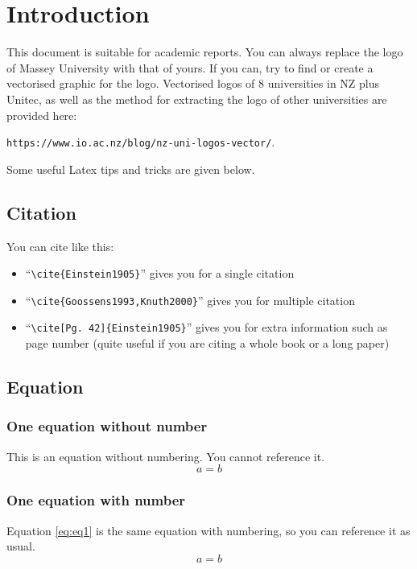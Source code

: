 
\chapter{Introduction}
\label{cp:introduction}


This document is suitable for academic reports. You can always replace the logo of Massey University with that of yours. If you can, try to find or create a vectorised graphic for the logo. Vectorised logos of 8 universities in NZ plus Unitec, as well as the method for extracting the logo of other universities are provided here:

\verb|https://www.io.ac.nz/blog/nz-uni-logos-vector/|.

Some useful Latex tips and tricks are given below.

\section{Citation}
You can cite like this:

\begin{itemize}
  \item ``\verb|\cite{Einstein1905}|'' gives you \cite{Einstein1905} for a single citation
  \item ``\verb|\cite{Goossens1993,Knuth2000}|'' gives you \cite{Goossens1993,Knuth2000} for multiple citation
  \item ``\verb|\cite[Pg. 42]{Einstein1905}|'' gives you \cite[Pg. 42]{Einstein1905} for extra information such as page number (quite useful if you are citing a whole book or a long paper)
\end{itemize}

\section{Equation}

\subsection{One equation without number}
This is an equation without numbering. You cannot reference it.
\begin{equation*}
a = b
\end{equation*}

\subsection{One equation with number}
Equation \ref{eq:eq1} is the same equation with numbering, so you can reference it as usual.
\begin{equation}
a = b
\label{eq:eq1}
\end{equation}

